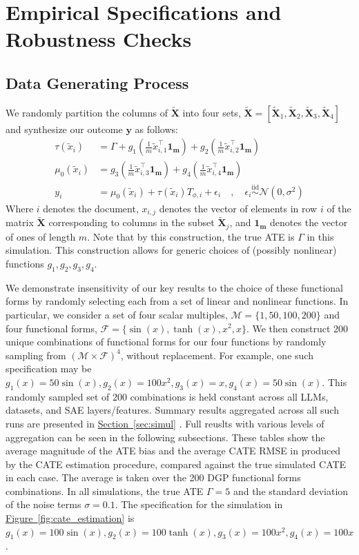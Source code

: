 \documentclass{article}
\theoremstyle{plain}
\theoremstyle{definition}
\theoremstyle{remark}
\newcommand{\myref}[2]{%
    \hyperref[#2]{#1~\ref*{#2}}%
}
\begin{document}
\section{Empirical Specifications and Robustness Checks}\label{apx:spec}

\subsection{Data Generating Process}
We randomly partition the columns of $\mathbf{\widetilde{X}}$ into four sets, $\mathbf{\widetilde{X}} = [\mathbf{\widetilde{X}}_1, \mathbf{\widetilde{X}}_2, \mathbf{\widetilde{X}}_3, \mathbf{\widetilde{X}}_4]$ and synthesize our outcome $\mathbf{y}$ as follows:
\begin{align*}
    \tau(\tilde{x}_i) &= \Gamma + g_1\left(\frac{1}{m}\tilde{x}_{i,1}^\top\mathbf{1_m}\right) + g_2\left(\frac{1}{m}\tilde{x}_{i,2}^\top\mathbf{1_m}\right) \\
    \mu_0(\tilde{x}_i) &= g_3\left(\frac{1}{m}\tilde{x}_{i,3}^\top\mathbf{1_m}\right) + g_4\left(\frac{1}{m}\tilde{x}_{i,4}^\top\mathbf{1_m}\right)\\
    y_i &= \mu_0(\tilde{x}_i) + \tau(\tilde{x}_i)T_{\phi,i} + \epsilon_i \quad, \quad \epsilon_i \overset{\mathrm{iid}}{\sim} \mathcal{N}(0, \sigma^2)
\end{align*}
Where $i$ denotes the document, $x_{i,j}$ denotes the vector of elements in row $i$ of the matrix $\mathbf{\widetilde{X}}$ corresponding to columns in the subset $\mathbf{\widetilde{X}}_j$, and $\mathbf{1_m}$ denotes the vector of ones of length $m$. Note that by this construction, the true ATE is $\Gamma$ in this simulation. This construction allows for generic choices of (possibly nonlinear) functions $g_1, g_2, g_3, g_4$. 

We demonstrate insensitivity of our key results to the choice of these functional forms by randomly selecting each from a set of linear and nonlinear functions. In particular, we consider a set of four scalar multiples, $\mathcal{M} = \{1, 50, 100, 200\}$ and four functional forms, $\mathcal{F} = \{\sin(x), \tanh(x), x^2, x\}$. We then construct 200 unique combinations of functional forms for our four functions by randomly sampling from $(\mathcal{M} \times \mathcal{F})^4$, without replacement. For example, one such specification may be $g_1(x) = 50\sin(x), g_2(x) = 100 x^2, g_3(x) = x, g_4(x)=50\sin(x)$. This randomly sampled set of 200 combinations is held constant across all LLMs, datasets, and SAE layers/features. Summary results aggregated across all such runs are presented in \myref{Section}{sec:simul}. Full reuslts with various levels of aggregation can be seen in the following subsections. These tables show the average magnitude of the ATE bias and the average CATE RMSE in produced by the CATE estimation procedure, compared against the true simulated CATE in each case. The average is taken over the 200 DGP functional forms combinations. In all simulations, the true ATE $\Gamma = 5$ and the standard deviation of the noise terms $\sigma = 0.1$. The specification for the simulation in \myref{Figure}{fig:cate_estimation} is $g_1(x) = 100\sin(x), g_2(x) = 100\tanh(x), g_3(x) = 100x^2, g_4(x)=100x$.
\end{document}
